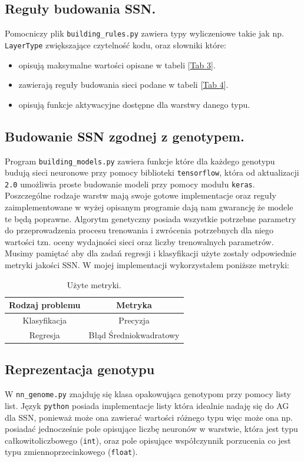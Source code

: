 \documentclass{article}
\begin{document}
\subsection{Reguły budowania SSN.}
Pomocniczy plik \texttt{building\_rules.py} zawiera typy wyliczeniowe takie jak np.
\texttt{LayerType} zwiększające czytelność kodu, oraz słowniki które:
\begin{itemize}
\item opisują maksymalne wartości opisane w tabeli [\hyperref[tab:zakres]{Tab 3}].
\item zawierają reguły budowania sieci podane w tabeli [\hyperref[tab:rules]{Tab 4}].
\item opisują funkcje aktywacyjne dostępne dla warstwy danego typu.
\end{itemize}

\subsection{Budowanie SSN zgodnej z genotypem.}
Program \texttt{building\_models.py} zawiera funkcje które dla każdego genotypu budują sieci neuronowe 
przy pomocy biblioteki \texttt{tensorflow}, która od aktualizacji \texttt{2.0}
umożliwia proste budowanie modeli przy pomocy modułu \texttt{keras}. Poszczególne 
rodzaje warstw mają swoje gotowe implementacje oraz reguły zaimplementowane w wyżej opisanym
programie dają nam gwarancję że modele te będą poprawne. Algorytm genetyczny posiada wszystkie
potrzebne parametry do przeprowadzenia procesu trenowania i zwrócenia potrzebnych dla niego
wartości tzn. oceny wydajności sieci oraz liczby trenowalnych parametrów. Musimy pamiętać
aby dla zadań regresji i klasyfikacji użyte zostały odpowiednie metryki jakości SSN.
W mojej implementacji wykorzystałem poniższe metryki:\\
\begin{table}[H]
\centering
\begin{tabular}{|c|c|}
	\hline 
	Rodzaj problemu & Metryka \\
	\hline
	Klasyfikacja & Precyzja \\
	Regresja & Błąd Średniokwadratowy\\
	\hline
\end{tabular}
\caption{\label{tam:met}Użyte metryki.}
\end{table}

\subsection{Reprezentacja genotypu}
W \texttt{nn\_genome.py} znajduję się klasa opakowująca genotypom przy pomocy listy list.
Język \texttt{python} posiada implementacje listy która idealnie nadaję się do AG dla SSN, 
ponieważ może ona zawierać wartości różnego typu więc może ona np. posiadać jednocześnie
pole opisujące liczbę neuronów w warstwie, która jest typu całkowitoliczbowego (\texttt{int}),
oraz pole opisujące współczynnik porzucenia co jest typu zmiennoprzecinkowego 
(\texttt{float}).
\end{document}
